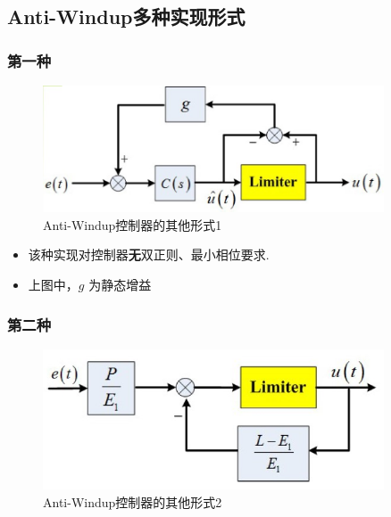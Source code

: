 \documentclass[14pt,a4paper]{article}
\theoremstyle{plain}
\theoremstyle{definition}
\theoremstyle{remark}
\theoremstyle{plain}
\theoremstyle{plain}
\theoremstyle{definition}
\begin{document}
		\subsection{Anti-Windup多种实现形式}%
		\label{sub:anti_windup多种实现形式}
		
			\subsubsection{第一种}%
			\label{ssub:第一种}
			
				\begin{figure}[H]
					\centering
					\includegraphics[width=0.9\textwidth]{./figures/aw1.jpg} 
					\caption{Anti-Windup控制器的其他形式1}
					\label{fig:aw1}
				\end{figure}
				 
				\begin{itemize}
					\item 该种实现对控制器\textbf{无}双正则、最小相位要求. 
					\item 上图中，$g$ 为静态增益 
				\end{itemize}  

			\subsubsection{第二种}%
			\label{ssub:第二种}
			
			\begin{figure}[H]
				\centering
				\includegraphics[width=0.9\textwidth]{./figures/aw2.jpg} 
				\caption{Anti-Windup控制器的其他形式2}
				\label{fig:aw2}
			\end{figure} 
\end{document}
